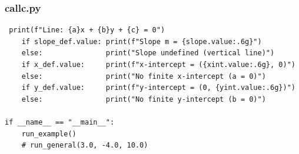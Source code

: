 \documentclass{beamer}
\begin{document}
\begin{frame}[fragile]
\frametitle{callc.py}
\begin{lstlisting}
 print(f"Line: {a}x + {b}y + {c} = 0")
    if slope_def.value: print(f"Slope m = {slope.value:.6g}")
    else:               print("Slope undefined (vertical line)")
    if x_def.value:     print(f"x-intercept = ({xint.value:.6g}, 0)")
    else:               print("No finite x-intercept (a = 0)")
    if y_def.value:     print(f"y-intercept = (0, {yint.value:.6g})")
    else:               print("No finite y-intercept (b = 0)")

if __name__ == "__main__":
    run_example()
    # run_general(3.0, -4.0, 10.0)


\end{lstlisting}
\end{frame}
\end{document}
